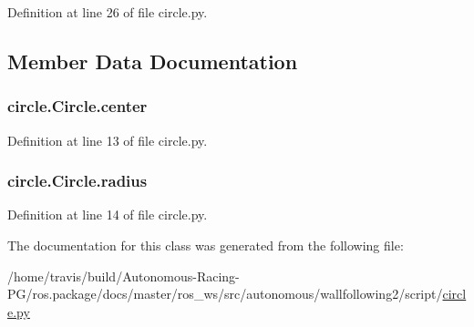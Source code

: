 Definition at line 26 of file circle.\+py.



\subsection{Member Data Documentation}
\subsubsection[{\texorpdfstring{center}{center}}]{\setlength{\rightskip}{0pt plus 5cm}circle.\+Circle.\+center}\hypertarget{classcircle_1_1_circle_aa2ed466736c7e4436ab6ded456ebd24b}{}\label{classcircle_1_1_circle_aa2ed466736c7e4436ab6ded456ebd24b}


Definition at line 13 of file circle.\+py.

\subsubsection[{\texorpdfstring{radius}{radius}}]{\setlength{\rightskip}{0pt plus 5cm}circle.\+Circle.\+radius}\hypertarget{classcircle_1_1_circle_a33aec6cd768f0a1850fae92cf3fcbc95}{}\label{classcircle_1_1_circle_a33aec6cd768f0a1850fae92cf3fcbc95}


Definition at line 14 of file circle.\+py.



The documentation for this class was generated from the following file\+:\begin{DoxyCompactItemize}
\item 
/home/travis/build/\+Autonomous-\/\+Racing-\/\+P\+G/ros.\+package/docs/master/ros\+\_\+ws/src/autonomous/wallfollowing2/script/\hyperlink{circle_8py}{circle.\+py}\end{DoxyCompactItemize}
